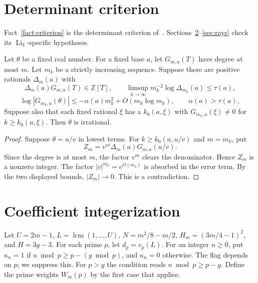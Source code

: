 \section{Determinant criterion}\label{sec:criterion}

Fact~\ref{fact:criterion} is the determinant criterion of~\cite[Section~3]{Zh}.
Sections~\ref{sec:integerization}--\ref{sec:rays} check its $\operatorname{Li}_3$-specific hypotheses.

\begin{fact}\label{fact:criterion}
Let $\theta$ be a fixed real number. For a fixed base $a$, let $G_{m,a}(T)$
have degree at most $m$. Let $m_k$ be a strictly increasing sequence. Suppose
there are positive rationals $\Delta_m(a)$ with
\[
\Delta_m(a)G_{m,a}(T)\in\mathbb Z[T],\qquad
\limsup_{k\to\infty} m_k^{-2}\log\Delta_{m_k}(a)\le\tau(a),
\]
\[
\log|G_{m_k,a}(\theta)|\le-\alpha(a)m_k^2+O(m_k\log m_k),
\qquad \alpha(a)>\tau(a),
\]
Suppose also that each fixed rational $\xi$ has a $k_0(a,\xi)$ with
$G_{m_k,a}(\xi)\ne0$ for $k\ge k_0(a,\xi)$.
Then $\theta$ is irrational.
\end{fact}

\begin{proof}
Suppose $\theta=u/v$ in lowest terms. For $k\ge k_0(a,u/v)$ and $m=m_k$, put
\[
 Z_m=v^m\Delta_m(a)G_{m,a}(u/v).
\]
Since the degree is at most $m$, the factor $v^m$ clears the denominator.
Hence $Z_m$ is a nonzero integer. The factor $|v|^{m_k}=e^{O(m_k)}$ is absorbed in the error term. By the two displayed bounds, $|Z_m|\to0$.
This is a contradiction.
\end{proof}

\section{Coefficient integerization}\label{sec:integerization}

Let \(U=2m-1\), \(L=\operatorname{lcm}(1,\ldots,U)\), \(N=m^2/8-m/2\), \(H_m=(3m/4-1)^2\), and \(H=3g-3\). For each prime \(p\), let \(d_p=v_p(L)\). For an integer \(n\ge0\), put \(\kappa_n=1\) if \(n\bmod p\ge p-(g\bmod p)\), and \(\kappa_n=0\) otherwise. The flag depends on \(p\); we suppress this. For \(p>g\) the condition reads \(n\bmod p\ge p-g\). Define the prime weights \(W_m(p)\) by the first case that applies:

